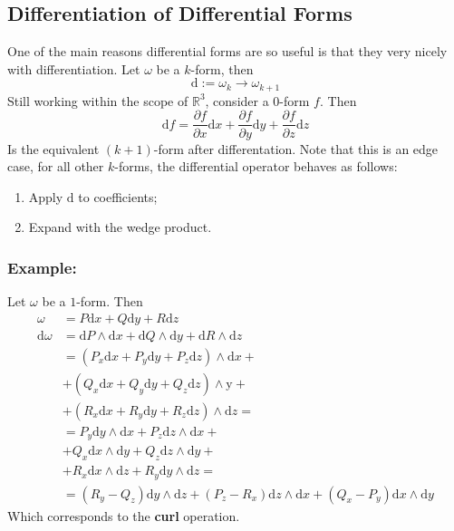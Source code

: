 \documentclass[twocolumn,10pt]{article}
\begin{document}
\subsection{Differentiation of Differential Forms}
One of the main reasons differential forms are so useful is that they very nicely with differentiation. Let $\omega$ be a $k$-form, then 
\[
	\mathrm{d}:= \omega_k \to \omega_{k+1}
\] 
Still working within the scope of $\mathbb{R}^{3}$, consider a $0$-form $f $. Then
\[
	\mathrm{d}f = \frac{\partial f}{\partial x} \mathrm{d}x + \frac{\partial f}{\partial y} \mathrm{d}y + \frac{\partial f}{\partial z} \mathrm{d}z
\] 
Is the equivalent $(k+1)$-form after differentation. Note that this is an edge case, for all other $k$-forms, the differential operator behaves as follows:
\begin{enumerate}
	\item Apply $\mathrm{d}$ to coefficients;
	\item Expand with the wedge product.
\end{enumerate}
\subsubsection{Example:}
Let $\omega$ be a $1$-form. Then
\begin{align*}
	\omega &= P\mathrm{d}x + Q\mathrm{d}y + R \mathrm{d}z\\
	\mathrm{d} \omega &= \mathrm{d} P\wedge \mathrm{d} x + \mathrm{d} Q \wedge \mathrm{d} y + \mathrm{d} R\wedge \mathrm{d} z\\
					  &= (P_x \mathrm{d} x + P_y \mathrm{d} y + P_z \mathrm{d} z)\wedge \mathrm{d} x +\\
					  &+ (Q_x \mathrm{d} x + Q_y \mathrm{d} y + Q_z \mathrm{d} z)\wedge \mathrm{y}  + \\
					  &+ (R_x \mathrm{d} x + R_y \mathrm{d} y + R_z \mathrm{d} z)\wedge \mathrm{d} z =\\
					  &= P_y \mathrm{d} y \wedge \mathrm{d} x + P_z \mathrm{d} z \wedge \mathrm{d} x + \\
					  &+ Q_x \mathrm{d} x \wedge \mathrm{d} y + Q_z \mathrm{d} z \wedge \mathrm{d} y +\\
					  &+ R_x \mathrm{d} x \wedge \mathrm{d} z + R_y \mathrm{d} y \wedge \mathrm{d} z =\\
					  &= (R_y - Q_z)\mathrm{d} y \wedge \mathrm{d} z + (P_z - R_x) \mathrm{d} z \wedge \mathrm{d} x + (Q_x - P_y)\mathrm{d} x \wedge \mathrm{d}y
\end{align*}
Which corresponds to the \textbf{curl} operation.
\end{document}
